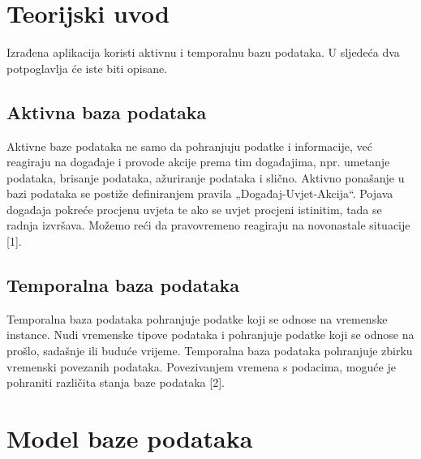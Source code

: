 \documentclass{foi}
\begin{document}
\chapter{Teorijski uvod} %

Izrađena aplikacija koristi aktivnu i temporalnu bazu podataka. U sljedeća dva potpoglavlja će iste biti opisane.
\section{Aktivna baza podataka}
Aktivne baze podataka ne samo da pohranjuju podatke i informacije, već reagiraju na događaje i provode akcije prema tim događajima, npr. umetanje podataka, brisanje podataka, ažuriranje podataka i slično. Aktivno ponašanje u bazi podataka se postiže definiranjem pravila „Događaj-Uvjet-Akcija“. Pojava događaja pokreće procjenu uvjeta te ako se uvjet procjeni istinitim, tada se radnja izvršava. Možemo reći da pravovremeno reagiraju na novonastale situacije [1].

\section{Temporalna baza podataka}
Temporalna baza podataka pohranjuje podatke koji se odnose na vremenske instance.  Nudi vremenske tipove podataka i pohranjuje podatke koji se odnose na prošlo, sadašnje ili buduće vrijeme. Temporalna baza podataka pohranjuje zbirku vremenski povezanih podataka. Povezivanjem vremena s podacima, moguće je pohraniti različita stanja baze podataka [2].

\chapter{Model baze podataka} %
\end{document}
